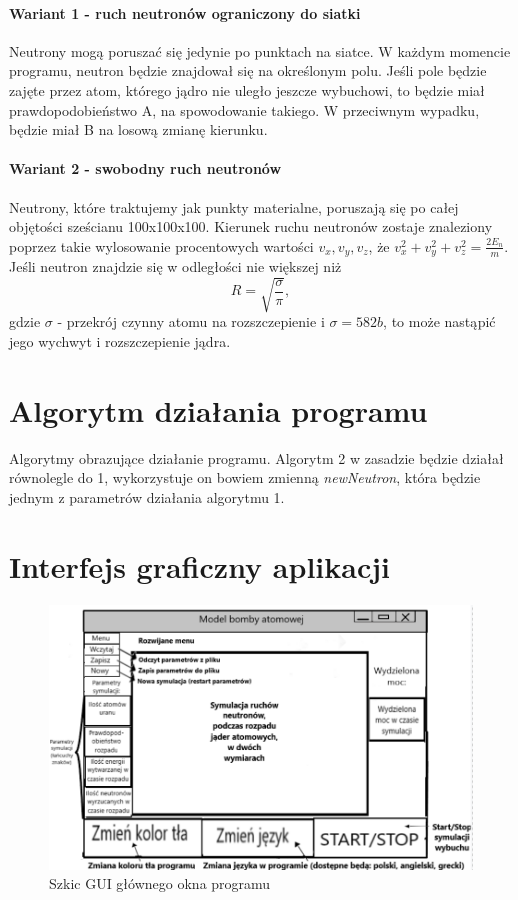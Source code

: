 \documentclass[12pt, a4paper, oneside]{article}
\begin{document}
\paragraph{Wariant 1 - ruch neutronów ograniczony do siatki}
Neutrony mogą poruszać się jedynie po punktach na siatce. W każdym momencie programu, neutron będzie znajdował się na określonym polu. Jeśli pole będzie zajęte przez atom, którego jądro nie uległo jeszcze wybuchowi, to będzie miał prawdopodobieństwo A, na spowodowanie takiego. W przeciwnym wypadku, będzie miał B na losową zmianę kierunku.

\paragraph{Wariant 2 - swobodny ruch neutronów}
Neutrony, które traktujemy jak punkty materialne, poruszają się po całej objętości sześcianu 100x100x100. Kierunek ruchu neutronów zostaje znaleziony poprzez takie wylosowanie procentowych wartości $v_x, v_y, v_z$, że $v_x^2+v_y^2+v_z^2=\frac{2E_n}{m}$. Jeśli neutron znajdzie się w odległości nie większej niż $$R=\sqrt{\frac{\sigma}{\pi}},$$
gdzie $\sigma$ - przekrój czynny atomu  na rozszczepienie i $\sigma=582 b$, to może nastąpić jego wychwyt i rozszczepienie jądra.

\section{Algorytm działania programu}
Algorytmy obrazujące działanie programu. Algorytm 2 w zasadzie będzie działał równolegle do 1, wykorzystuje on bowiem zmienną \textit{newNeutron}, która będzie jednym z parametrów działania algorytmu 1.


\section{Interfejs graficzny aplikacji}
\begin{figure}[h!]
    \centering
    \includegraphics[scale=0.3]{GUI.png}
    \caption{Szkic GUI głównego okna programu}
    \label{fig:my_label}
\end{figure}
\end{document}
